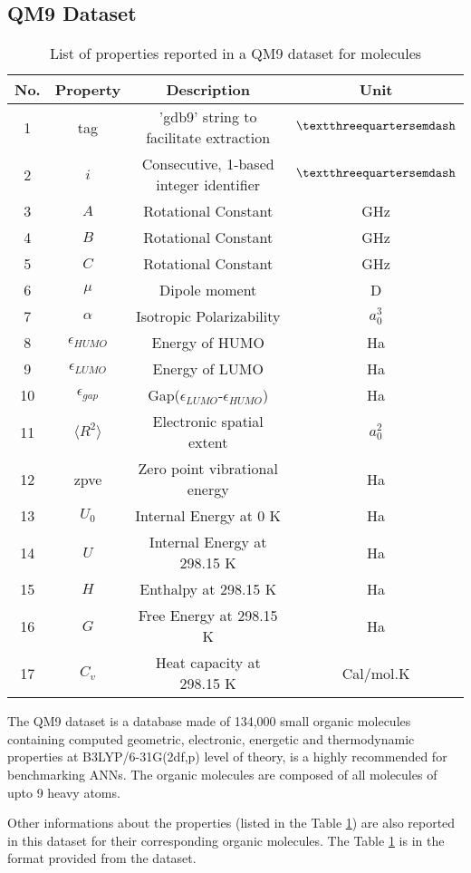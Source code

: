 \documentclass[11pt,a4paper]{report}
\begin{document}
{\subsection{QM9 Dataset}
\begin{table} [H]
\centering
\begin{tabular}{c|c|c|c}
\hline
No. & Property & Description & Unit \\ [0.5ex]
\hline
1 & tag & 'gdb9' string to facilitate extraction & $\textthreequartersemdash$ \\
2 & $i$ & Consecutive, 1-based integer identifier & $\textthreequartersemdash$ \\
3 & $A$ & Rotational Constant & GHz \\
4 & $B$ & Rotational Constant & GHz \\
5 & $C$ & Rotational Constant & GHz \\
6 & $\mu$ & Dipole moment & D \\
7 & $\alpha$ & Isotropic Polarizability & $a_0^3$ \\
8 & $\epsilon_{HUMO}$ & Energy of HUMO & Ha \\
9 & $\epsilon_{LUMO}$ & Energy of LUMO & Ha \\
10 & $\epsilon_{gap}$ & Gap($\epsilon_{LUMO}$-$\epsilon_{HUMO}$) & Ha \\
11 & $\langle R^2 \rangle$ & Electronic spatial extent & $a^2_0$ \\
12 & zpve & Zero point vibrational energy & Ha \\
13 & $U_0$ & Internal Energy at 0 K & Ha \\
14 & $U$ & Internal Energy at 298.15 K & Ha \\
15 & $H$ & Enthalpy at 298.15 K & Ha \\
16 & $G$ & Free Energy at 298.15 K & Ha \\
17 & $C_v$ & Heat capacity at 298.15 K & Cal/mol.K \\
\hline
\end{tabular}
\caption{List of properties reported in a QM9 dataset for molecules}
\label{QM9}
\end{table}
The QM9 dataset\cite{QM9} is a database made of 134,000 small organic molecules containing computed geometric, electronic, energetic and thermodynamic properties at B3LYP/6-31G(2df,p) level of theory\cite{DFT}, is a highly recommended for benchmarking ANNs. The organic molecules are composed of all molecules of upto 9 heavy atoms. 

Other informations about the properties (listed in the Table \ref{QM9}) are also reported in this dataset for their corresponding organic molecules. The Table \ref{QM9} is in the format provided from the dataset.

}
\end{document}
